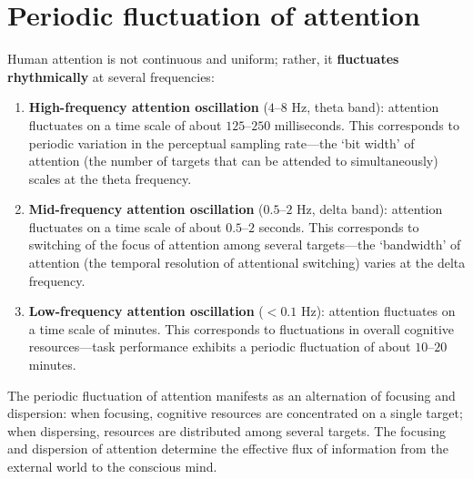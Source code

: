 \section{Periodic fluctuation of attention}

\begin{definition}\label{def:attention_oscillation}
Human attention is not continuous and uniform; rather, it \textbf{fluctuates rhythmically} at several frequencies:
\begin{enumerate}[label=(\roman*)]
    \item \textbf{High-frequency attention oscillation} ($4$--$8$ Hz, theta band): attention fluctuates on a time scale of about $125$--$250$ milliseconds. This corresponds to periodic variation in the perceptual sampling rate---the `bit width' of attention (the number of targets that can be attended to simultaneously) scales at the theta frequency.
    \item \textbf{Mid-frequency attention oscillation} ($0.5$--$2$ Hz, delta band): attention fluctuates on a time scale of about $0.5$--$2$ seconds. This corresponds to switching of the focus of attention among several targets---the `bandwidth' of attention (the temporal resolution of attentional switching) varies at the delta frequency.
    \item \textbf{Low-frequency attention oscillation} ($<0.1$ Hz): attention fluctuates on a time scale of minutes. This corresponds to fluctuations in overall cognitive resources---task performance exhibits a periodic fluctuation of about $10$--$20$ minutes.
\end{enumerate}
The periodic fluctuation of attention manifests as an alternation of focusing and dispersion: when focusing, cognitive resources are concentrated on a single target; when dispersing, resources are distributed among several targets. The focusing and dispersion of attention determine the effective flux of information from the external world to the conscious mind.
\end{definition}


